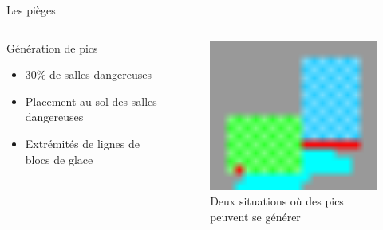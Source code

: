 \documentclass{beamer}
\begin{document}
{\begin{frame}{Les pièges}
    \begin{columns}
        \begin{block}{Génération de pics}
            \begin{itemize}
                \item[\bullet] 30\% de salles dangereuses
                \item[\bullet] Placement au sol des salles dangereuses
                \item[\bullet] Extrémités de lignes de blocs de glace
            \end{itemize}
        \end{block}
        \begin{figure}
            \centering
            \includegraphics[width=1.0\textwidth]{ice_spike_trap}
            \caption{Deux situations où des pics peuvent se générer}
        \end{figure}
    \end{columns}
\end{frame}

}
\end{document}
